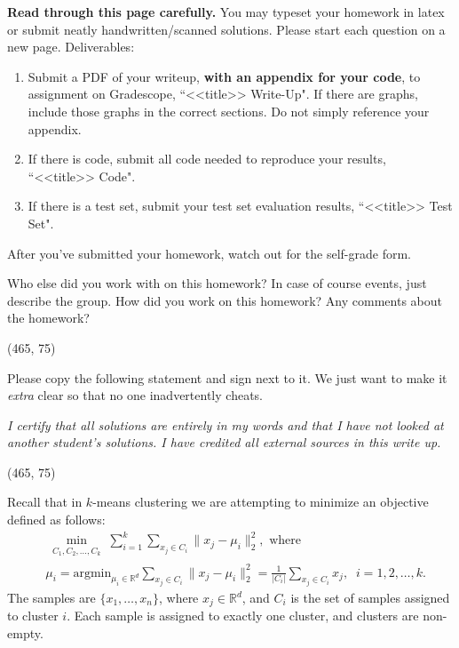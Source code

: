\documentclass[preview]{standalone}
\begin{document}
\fontsize{12}{15}\selectfont


\textbf{Read through this page carefully.} You may typeset your homework in latex or submit neatly handwritten/scanned solutions. Please start each question on a new page. Deliverables:

\begin{enumerate}
  \item Submit a PDF of your writeup, \textbf{with an appendix for your code}, to assignment on Gradescope, ``<<title>> Write-Up". If there are graphs, include those graphs in the correct sections. Do not simply reference your appendix.
  \item If there is code, submit all code needed to reproduce your results, ``<<title>> Code".
  \item If there is a test set, submit your test set evaluation results, ``<<title>> Test Set".
\end{enumerate}

After you've submitted your homework, watch out for the self-grade form.

\begin{Parts}

\Part Who else did you work with on this homework? In case of course events, just describe the group. How did you work on this homework? Any comments about the homework?

\vspace{15pt}
\framebox(465, 75){}

\Part Please copy the following statement and sign next to it. We just want to make it \textit{extra} clear so that no one inadvertently cheats.

\textit{I certify that all solutions are entirely in my words and that I have not looked at another student's solutions. I have credited all external sources in this write up.}

\vspace{15pt}
\framebox(465, 75){}

\end{Parts}

\pagebreak



Recall that in $k$-means clustering we are attempting to minimize an objective defined as follows:
\begin{align*}
&\min_{\substack{C_1,C_2,\dots,C_k}} \sum_{i=1}^k{\sum_{x_j \in C_i}{\|x_j - \mu_i\|_2^2}}, \text{ where}\\
&\mu_i = \text{argmin}_{\mu_i\in\mathbb R^d}{\sum_{x_j \in C_i}{\|x_j - \mu_i\|_2^2}}=\frac{1}{|C_i|} \sum_{x_j \in C_i}{x_j}, \;\; i=1,2,\dots,k.
\end{align*}
The samples are $\{x_1, \ldots, x_n\}$, where $x_j \in \mathbb{R}^d$, and $C_i$ is the set of samples assigned to cluster $i$. Each sample is assigned to exactly one cluster, and clusters are non-empty.
\end{document}

